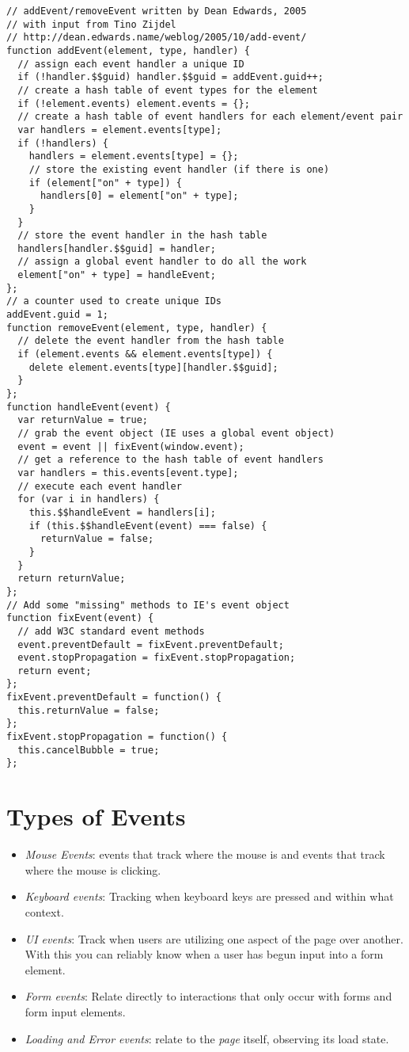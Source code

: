 \documentclass[a4paper,11pt]{book}
\begin{document}
\begin{verbatim}
// addEvent/removeEvent written by Dean Edwards, 2005
// with input from Tino Zijdel
// http://dean.edwards.name/weblog/2005/10/add-event/
function addEvent(element, type, handler) {
  // assign each event handler a unique ID
  if (!handler.$$guid) handler.$$guid = addEvent.guid++;
  // create a hash table of event types for the element
  if (!element.events) element.events = {};
  // create a hash table of event handlers for each element/event pair
  var handlers = element.events[type];
  if (!handlers) {
    handlers = element.events[type] = {};
    // store the existing event handler (if there is one)
    if (element["on" + type]) {
      handlers[0] = element["on" + type];
    }
  }
  // store the event handler in the hash table
  handlers[handler.$$guid] = handler;
  // assign a global event handler to do all the work
  element["on" + type] = handleEvent;
};
// a counter used to create unique IDs
addEvent.guid = 1;
function removeEvent(element, type, handler) {
  // delete the event handler from the hash table
  if (element.events && element.events[type]) {
    delete element.events[type][handler.$$guid];
  }
};
function handleEvent(event) {
  var returnValue = true;
  // grab the event object (IE uses a global event object)
  event = event || fixEvent(window.event);
  // get a reference to the hash table of event handlers
  var handlers = this.events[event.type];
  // execute each event handler
  for (var i in handlers) {
    this.$$handleEvent = handlers[i];
    if (this.$$handleEvent(event) === false) {
      returnValue = false;
    }
  }
  return returnValue;
};
// Add some "missing" methods to IE's event object
function fixEvent(event) {
  // add W3C standard event methods
  event.preventDefault = fixEvent.preventDefault;
  event.stopPropagation = fixEvent.stopPropagation;
  return event;
};
fixEvent.preventDefault = function() {
  this.returnValue = false;
};
fixEvent.stopPropagation = function() {
  this.cancelBubble = true;
};
\end{verbatim}
\section{Types of Events}
\begin{itemize}
\item \emph{Mouse Events}: events that track where the mouse is and events that
track where the mouse is clicking.
\item \emph{Keyboard events}: Tracking when keyboard keys are pressed and within
what context.
\item \emph{UI events}: Track when users are utilizing one aspect of the page
over another. With this you can reliably know when a user has begun input into a
form element.
\item \emph{Form events}: Relate directly to interactions that only occur with
forms and form input elements.
\item \emph{Loading and Error events}: relate to the \emph{page} itself,
observing its load state. 
\end{itemize}
\end{document}
